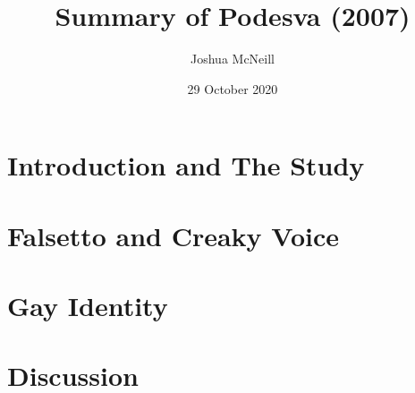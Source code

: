 \documentclass{article}
\title{Summary of Podesva (2007)}
\author{Joshua McNeill}
\date{29 October 2020}
\begin{document}
  \maketitle
  \section{Introduction and The Study}
  \section{Falsetto and Creaky Voice}
  \section{Gay Identity}
  \section{Discussion}
\end{document}

